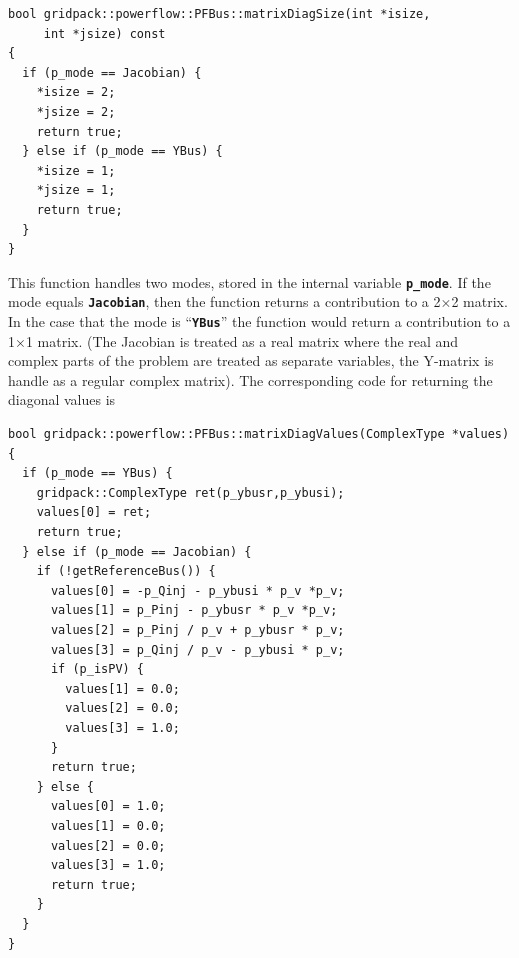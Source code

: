 {
\color{red}
\begin{Verbatim}[fontseries=b]
bool gridpack::powerflow::PFBus::matrixDiagSize(int *isize,
     int *jsize) const
{
  if (p_mode == Jacobian) {
    *isize = 2;
    *jsize = 2;
    return true;
  } else if (p_mode == YBus) {
    *isize = 1;
    *jsize = 1;
    return true;
  }
}
\end{Verbatim}
}

This function handles two modes, stored in the internal variable \texttt{\textbf{p\_mode}}. If the mode equals \texttt{\textbf{Jacobian}}, then the function returns a contribution to a 2$\mathrm{\times}$2 matrix. In the case that the mode is ``\texttt{\textbf{YBus}}'' the function would return a contribution to a 1$\mathrm{\times}$1 matrix. (The Jacobian is treated as a real matrix where the real and complex parts of the problem are treated as separate variables, the Y-matrix is handle as a regular complex matrix). The corresponding code for returning the diagonal values is

{
\color{red}
\begin{Verbatim}[fontseries=b]
bool gridpack::powerflow::PFBus::matrixDiagValues(ComplexType *values)
{
  if (p_mode == YBus) {
    gridpack::ComplexType ret(p_ybusr,p_ybusi);
    values[0] = ret;
    return true;
  } else if (p_mode == Jacobian) {
    if (!getReferenceBus()) {
      values[0] = -p_Qinj - p_ybusi * p_v *p_v;
      values[1] = p_Pinj - p_ybusr * p_v *p_v;
      values[2] = p_Pinj / p_v + p_ybusr * p_v;
      values[3] = p_Qinj / p_v - p_ybusi * p_v;
      if (p_isPV) {
        values[1] = 0.0;
        values[2] = 0.0;
        values[3] = 1.0;
      }
      return true;
    } else {
      values[0] = 1.0;
      values[1] = 0.0;
      values[2] = 0.0;
      values[3] = 1.0;
      return true;
    }
  }
}
\end{Verbatim}
}

